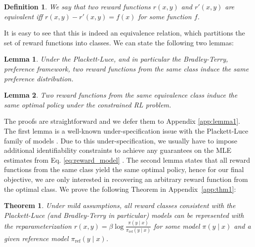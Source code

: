 \documentclass{article}
\newtheorem{theorem}{Theorem}
\newtheorem{lemma}{Lemma}
\newtheorem{definition}{Definition}
\newcommand{\piref}{\pi_\text{ref}}
\begin{document}
\begin{definition}
We say that two reward functions $r(x, y)$ and $r'(x, y)$ are equivalent iff ${r(x, y)-r'(x, y) = f(x)}$ for some function $f$.     
\end{definition}
It is easy to see that this is indeed an equivalence relation, which partitions the set of reward functions into classes. We can state the following two lemmas:

\begin{lemma}\label{lemma:same_prefrence} Under the Plackett-Luce, and in particular the Bradley-Terry, preference framework, two reward functions from the same class induce the same preference distribution.
\end{lemma}

\begin{lemma}\label{lemma:same_policy}
    Two reward functions from the same equivalence class induce the same optimal policy under the constrained RL problem.
\end{lemma}
The proofs are straightforward and we defer them to Appendix \ref{app:lemma1}. The first lemma is a well-known under-specification issue with the Plackett-Luce family of models \cite{plackett1975analysis}. Due to this under-specification, we usually have to impose additional identifiability constraints to achieve any guarantees on the MLE estimates from Eq. \ref{eq:reward_model} \cite{bong2022generalized}. The second lemma states that all reward functions from the same class yield the same optimal policy, hence for our final objective, we are only interested in recovering an arbitrary reward function from the optimal class. We prove the following Theorem in Appendix~\ref{app:thm1}:
\begin{theorem}\label{thm:main}
    Under mild assumptions, all reward classes consistent with the Plackett-Luce (and Bradley-Terry in particular) models can be represented with the reparameterization ${r(x, y) = \beta \log \frac{\pi(y\mid x)}{\piref(y\mid x)}}$ for some model $\pi(y\mid x)$ and a given reference model $\piref(y \mid x)$.
\end{theorem}
\end{document}
